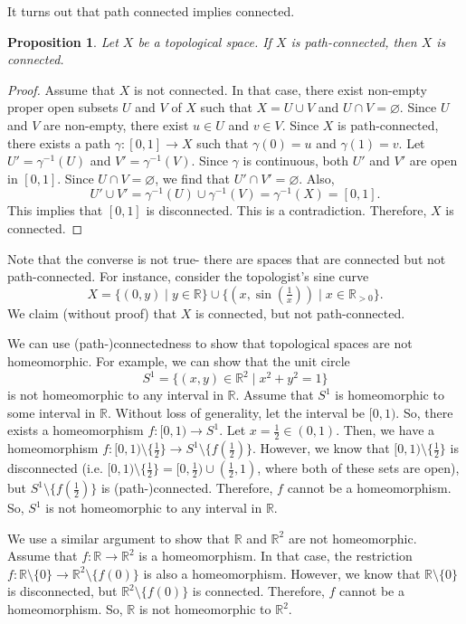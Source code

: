 \documentclass[a4paper, openany]{memoir}
\theoremstyle{definition}
\theoremstyle{plain}
\newtheorem{proposition}[definition]{Proposition}
\begin{document}
It turns out that path connected implies connected.
\begin{proposition}
Let $X$ be a topological space. If $X$ is path-connected, then $X$ is connected.
\end{proposition}
\begin{proof}
Assume that $X$ is not connected. In that case, there exist non-empty proper open subsets $U$ and $V$ of $X$ such that $X = U \cup V$ and $U \cap V = \varnothing$. Since $U$ and $V$ are non-empty, there exist $u \in U$ and $v \in V$. Since $X$ is path-connected, there exists a path $\gamma: [0, 1] \to X$ such that $\gamma(0) = u$ and $\gamma(1) = v$. Let $U' = \gamma^{-1}(U)$ and $V' = \gamma^{-1}(V)$. Since $\gamma$ is continuous, both $U'$ and $V'$ are open in $[0, 1]$. Since $U \cap V = \varnothing$, we find that $U' \cap V' = \varnothing$. Also, 
\[U' \cup V' = \gamma^{-1}(U) \cup \gamma^{-1}(V) = \gamma^{-1}(X) = [0, 1].\]
This implies that $[0, 1]$ is disconnected. This is a contradiction. Therefore, $X$ is connected.
\end{proof}
\noindent Note that the converse is not true- there are spaces that are connected but not path-connected. For instance, consider the topologist's sine curve
\[X = \{(0, y) \mid y \in \mathbb{R}\} \cup \{(x, \sin (\tfrac{1}{x})) \mid x \in \mathbb{R}_{> 0}\}.\]
We claim (without proof) that $X$ is connected, but not path-connected.

We can use (path-)connectedness to show that topological spaces are not homeomorphic. For example, we can show that the unit circle 
\[S^1 = \{(x, y) \in \mathbb{R}^2 \mid x^2 + y^2 = 1\}\]
is not homeomorphic to any interval in $\mathbb{R}$. Assume that $S^1$ is homeomorphic to some interval in $\mathbb{R}$. Without loss of generality, let the interval be $[0, 1)$. So, there exists a homeomorphism $f: [0, 1) \to S^1$. Let $x = \frac{1}{2} \in (0, 1)$. Then, we have a homeomorphism $f: [0, 1) \setminus \{\frac{1}{2}\} \to S^1 \setminus \{f(\frac{1}{2})\}$. However, we know that $[0, 1) \setminus \{\frac{1}{2}\}$ is disconnected (i.e. $[0, 1) \setminus \{\frac{1}{2}\} = [0, \frac{1}{2}) \cup (\frac{1}{2}, 1)$, where both of these sets are open), but $S^1 \setminus \{f(\frac{1}{2})\}$ is (path-)connected. Therefore, $f$ cannot be a homeomorphism. So, $S^1$ is not homeomorphic to any interval in $\mathbb{R}$.

We use a similar argument to show that $\mathbb{R}$ and $\mathbb{R}^2$ are not homeomorphic. Assume that $f: \mathbb{R} \to \mathbb{R}^2$ is a homeomorphism. In that case, the restriction $f: \mathbb{R} \setminus \{0\} \to \mathbb{R}^2 \setminus \{f(0)\}$ is also a homeomorphism. However, we know that $\mathbb{R} \setminus \{0\}$ is disconnected, but $\mathbb{R}^2 \setminus \{f(0)\}$ is connected. Therefore, $f$ cannot be a homeomorphism. So, $\mathbb{R}$ is not homeomorphic to $\mathbb{R}^2$.
\end{document}
